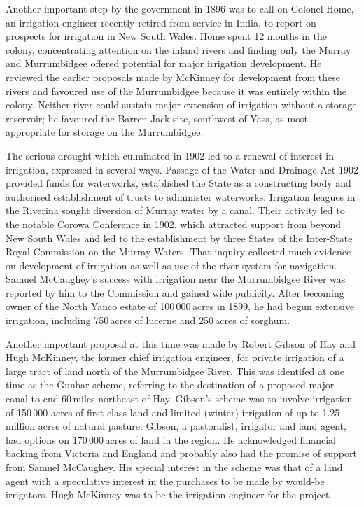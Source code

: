 Another important step by the government in 1896 was to call on
Colonel Home,  an irrigation engineer recently
retired from service in India, to report on prospects for irrigation
in New South Wales.  Home spent 12 months in the colony, concentrating
attention on the inland rivers and finding only the Murray and
Murrumbidgee offered potential for major irrigation development.  He
reviewed the earlier proposals made by McKinney for development from
these rivers and favoured use of the Murrumbidgee because it was
entirely within the colony. Neither river could sustain major
extension of irrigation without a storage reservoir; he favoured the
Barren Jack site, southwest of Yass, as most appropriate for storage
on the Murrumbidgee.

The serious drought which culminated in 1902 led to a renewal of
interest in irrigation, expressed in several ways.  Passage of the
Water and Drainage Act 1902 \index{legislation!NSW!Water and Drainage
Act 1902} provided funds for waterworks, established the State as a
constructing body and authorised establishment of trusts to administer
waterworks.  Irrigation leagues in the Riverina sought diversion of
Murray water by a canal.  Their activity led to the notable Corowa
Conference in 1902, which attracted support from beyond New South
Wales and led to the establishment by three States of the Inter-State
Royal Commission on the Murray Waters.  That inquiry collected much
evidence on development of irrigation as well as use of the river
system for navigation. Samuel McCaughey's success with irrigation near
the Murrumbidgee River was reported by him to the Commission and
gained wide publicity. After becoming owner of the North Yanco
 estate of 100\,000\,acres in 1899, he had
begun extensive irrigation, including 750\,acres of lucerne and
250\,acres of sorghum.


Another important proposal at this time was made by Robert Gibson
\index{Gibson, R.} of Hay and Hugh McKinney, \index{KcKinney, H.} the
former chief irrigation engineer, for private irrigation of a large
tract of land north of the Murrumbidgee
River.  This was identifed at one time as
the Gunbar scheme, referring to the destination of a proposed major
canal to end 60\,miles northeast of Hay.  Gibson's scheme was to
involve irrigation of 150\,000 acres of first-class land and limited
(winter) irrigation of up to 1.25 million acres of natural pasture.
Gibson, a pastoralist, irrigator and land agent, had options on
170\,000\,acres of land in the region.  He acknowledged financial
backing from Victoria and England and probably also had the promise of
support from Samuel McCaughey.  His special interest in the scheme was
that of a land agent with a speculative interest in the purchases to
be made by would-be irrigators.  Hugh McKinney was to be the
irrigation engineer for the project.

